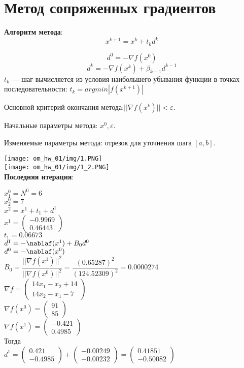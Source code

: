 \section{Метод сопряженных градиентов}

\textbf{Алгоритм метода}:
$$ x^{k+1} = x^{k} + t_{k}d^{k}$$

$$ d^{0} = - \nabla f(x^{0})$$
$$ d^{k} = - \nabla f(x^{k}) + \beta_{k - 1}d^{k - 1}$$
$t_{k}$ --- шаг вычисляется из условия наибольшего убывания функции в точках последовательности: $t_{k} = argmin|f(x^{k+1})|$


Основной критерий окончания метода:$|| \nabla f(x^{k})|| < \varepsilon$.

Начальные параметры метода: $x^{0}, \varepsilon$.

Изменяемые параметры метода: отрезок для уточнения шага $[a, b]$.

\texttt{[image: om\_hw\_01/img/1.PNG]}\\
\texttt{[image: om\_hw\_01/img/1\_2.PNG]}\\

\textbf{Последняя итерация}:

$x^{0}_{1} = N^{0} = 6$\\
$x^{0}_{2} = 7$\\
$x^{2} = x^{1} + t_{1} +d^{1}$\\
$
x^{1} = 
\begin{pmatrix}
  -0.9969\\
  0.46443
\end{pmatrix}
$\\
$t_{1} = 0.06673$\\
$d^{1} = -\nablaf(x^{1}) + B_{0}d^{0}$\\
$d^{0} = -\nablaf(x^{0})$\\
$B_{0} = \dfrac{||\nabla f(x^{1})||^{2}}{||\nabla f(x^{0})||^{2}} = \dfrac{(0.65287)^{2}}{(124.52309)^{2}} = 0.0000274$\\
$
\nabla f = 
\begin{pmatrix}
  14x_{1} - x_{2} + 14\\
  14x_{2} - x_{1} - 7
\end{pmatrix}
$\\
$
\nabla f(x^{0}) = 
\begin{pmatrix}
  91\\
  85
\end{pmatrix}
$\\
$
\nabla f(x^{1}) = 
\begin{pmatrix}
  -0.421\\
  0.4985
\end{pmatrix}
$\\
Тогда\\
$
d^{1} = 
\begin{pmatrix}
  0.421\\
  -0.4985
\end{pmatrix}
+
\begin{pmatrix}
  -0.00249\\
  -0.00232
\end{pmatrix}
=
\begin{pmatrix}
  0.41851\\
  -0.50082
\end{pmatrix}
$\\

